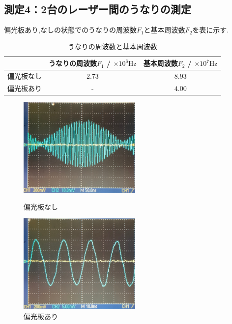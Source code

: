 \subsection{測定4：2台のレーザー間のうなりの測定}
偏光板あり,なしの状態でのうなりの周波数$F_1$と基本周波数$F_2$を表に示す.
\begin{table}[h]
\caption{うなりの周波数と基本周波数}
\label{tab:unari_kihon}
\centering
\begin{tabular}{ccc}
\hline
&うなりの周波数$F_1$ / $\times10^6\si{\hertz}$&基本周波数$F_2$ / $\times10^7\si{\hertz}$\\
\hline \hline
偏光板なし&$2.73$&$8.93$\\
偏光板あり&-&$4.00$\\
\hline
\end{tabular}
\end{table}
\begin{figure}[htbp]
  \begin{minipage}{0.5\hsize}
   \begin{center}
    \includegraphics[width=60mm]{fig/fig7.JPG}
   \end{center}
   \caption{偏光板なし}
   \label{fig:no_polar}
  \end{minipage}
  \begin{minipage}{0.5\hsize}
   \begin{center}
    \includegraphics[width=60mm]{fig/fig8.JPG}
   \end{center}
   \caption{偏光板あり}
   \label{fig:polar}
  \end{minipage}
 \end{figure}